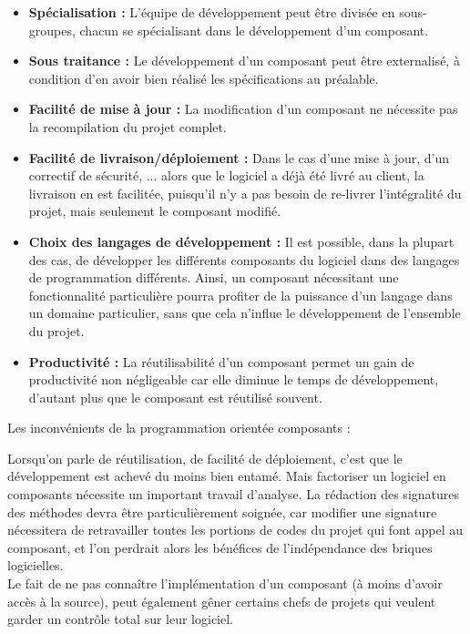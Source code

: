 \documentclass[12pt]{report}
\begin{document}
\begin{itemize}
    \item \textbf{Spécialisation :} L'équipe de développement peut être divisée en sous-groupes, chacun se spécialisant dans le développement d'un composant.
    \item \textbf{Sous traitance :} Le développement d'un composant peut être externalisé, à condition d'en avoir bien réalisé les spécifications au préalable.
    \item \textbf{Facilité de mise à jour :} La modification d'un composant ne nécessite pas la recompilation du projet complet.
    \newpage
    \vspace*{0.2in}
    \item \textbf{Facilité de livraison/déploiement :} Dans le cas d'une mise à jour, d'un correctif de sécurité, ... alors que le logiciel a déjà été livré au client, la livraison en est facilitée, puisqu'il n'y a pas besoin de re-livrer l'intégralité du projet, mais seulement le composant modifié.
    \item \textbf{Choix des langages de développement :} Il est possible, dans la plupart des cas, de développer les différents composants du logiciel dans des langages de programmation différents. Ainsi, un composant nécessitant une fonctionnalité particulière pourra profiter de la puissance d'un langage dans un domaine particulier, sans que cela n'influe le développement de l'ensemble du projet.
    \item \textbf{Productivité :} La réutilisabilité d'un composant permet un gain de productivité non négligeable car elle diminue le temps de développement, d'autant plus que le composant est réutilisé souvent. 
\end{itemize}

\vspace{0.1in}
Les inconvénients de la programmation orientée composants :
\vspace{0.1in}


Lorsqu’on parle de réutilisation, de facilité de déploiement, c'est que le développement est achevé du moins bien entamé. Mais factoriser un logiciel en composants nécessite un important travail d'analyse. La rédaction des signatures des méthodes devra être particulièrement soignée, car modifier une signature nécessitera de retravailler toutes les portions de codes du projet qui font appel au composant, et l'on perdrait alors les bénéfices de l'indépendance des briques logicielles.
\\
Le fait de ne pas connaître l'implémentation d'un composant (à moins d'avoir accès à la source), peut également gêner certains chefs de projets qui veulent garder un contrôle total sur leur logiciel.
\end{document}

